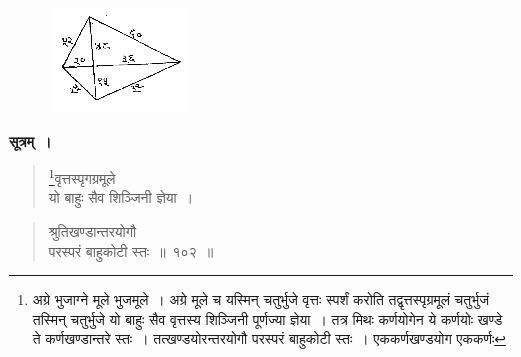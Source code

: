 \documentclass[11pt, openany]{book}
\begin{document}
\begin{figure}[h!]
    \centering
    \includegraphics[scale=0.85]{graphics/capture121.png}
\end{figure}
\vspace{-2mm}

\setcounter{footnote}{0}
 \textbf{सूत्रम्~।} 
\begin{quote}
    \bs 
    \footnote{अग्रे भुजाग्ने मूले भुजमूले~। अग्रे मूले च यस्मिन् चतुर्भुजे
वृत्तः स्पर्शं करोति तद्वृत्तस्पृग्रमूलं चतुर्भुजं तस्मिन् चतुर्भुजे
यो बाहुः सैव वृत्तस्य शिञ्जिनी पूर्णज्या ज्ञेया~। तत्र मिथः कर्णयोगेन ये कर्णयोः खण्डे ते कर्णखण्डान्तरे स्तः~। तत्खण्डयोरन्तरयोगौ परस्परं बाहुकोटी स्तः~। एककर्णखण्डयोग एककर्णः}वृत्तस्पृगग्रमूले \\
यो बाहुः सैव शिञ्जिनी ज्ञेया~।
\end{quote}
\newpage%
\begin{quote}
    \bs 
श्रुतिखण्डान्तरयोगौ \\
परस्परं बाहुकोटी स्तः~॥~१०२~॥
\end{quote}
\end{document}
